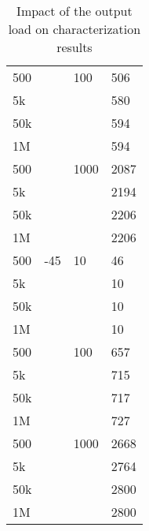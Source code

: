 \begin{table}[!p]
\begin{tabular}{llll}
500               &            & 100        &  506   \\
5k                &            &            &  580   \\
50k               &            &            &  594   \\
1M                &            &            &  594   \\
\rowcolor[gray]{.95}
500               &            & 1000       & 2087    \\ \rowcolor[gray]{.95}
5k                &            &            & 2194    \\ \rowcolor[gray]{.95}
50k               &            &            & 2206    \\ \rowcolor[gray]{.95}
1M                &            &            & 2206    \\

500               & -45        & 10         & 46    \\
5k                &            &            & 10    \\
50k               &            &            & 10    \\
1M                &            &            & 10    \\
\rowcolor[gray]{.95}
500               &            & 100        & 657    \\ \rowcolor[gray]{.95}
5k                &            &            & 715    \\ \rowcolor[gray]{.95}
50k               &            &            & 717    \\ \rowcolor[gray]{.95}
1M                &            &            & 727    \\

500               &            & 1000       & 2668    \\
5k                &            &            & 2764   \\
50k               &            &            & 2800    \\
1M                &            &            & 2800    \\

\bottomrule
\end{tabular}
\caption{Impact of the output load on characterization results}
\label{tab:impact-load-on-cz}
\end{table}

